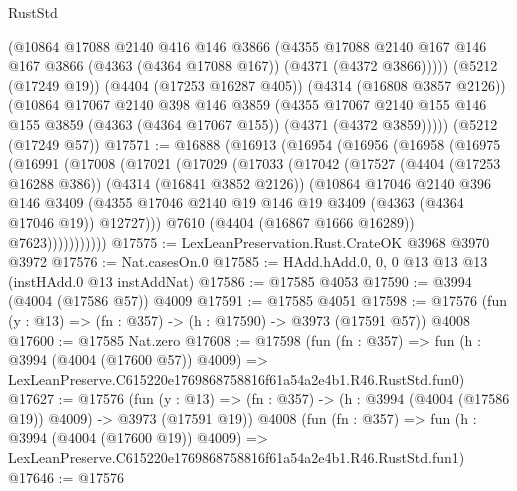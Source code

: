 \begin{lexlean}{RustStd}
\begin{coremodule}
        (@10864
          @17088
          @2140
          @416
          @146
          @3866
          (@4355
            @17088
            @2140
            @167
            @146
            @167
            @3866
            (@4363 (@4364 @17088 @167))
            (@4371 (@4372 @3866)))))
      (@5212 (@17249 @19))
      (@4404 (@17253 @16287 @405))
      (@4314 (@16808 @3857 @2126))
      (@10864
        @17067
        @2140
        @398
        @146
        @3859
        (@4355
          @17067
          @2140
          @155
          @146
          @155
          @3859
          (@4363 (@4364 @17067 @155))
          (@4371 (@4372 @3859)))))
    (@5212 (@17249 @57))
@17571 := @16888
    (@16913
      (@16954
        (@16956
          (@16958
            (@16975
              (@16991
                (@17008
                  (@17021
                    (@17029
                      (@17033
                        (@17042
                          (@17527
                            (@4404 (@17253 @16288 @386))
                            (@4314 (@16841 @3852 @2126))
                            (@10864
                              @17046
                              @2140
                              @396
                              @146
                              @3409
                              (@4355
                                @17046
                                @2140
                                @19
                                @146
                                @19
                                @3409
                                (@4363 (@4364 @17046 @19))
                                @12727)))
                          @7610
                          (@4404 (@16867 @1666 @16289))
                          @7623)))))))))))
@17575 := LexLeanPreservation.Rust.CrateOK @3968 @3970 @3972
@17576 := Nat.casesOn.{0}
@17585 := HAdd.hAdd.{0, 0, 0} @13 @13 @13 (instHAdd.{0} @13 instAddNat)
@17586 := @17585 @4053
@17590 := @3994 (@4004 (@17586 @57)) @4009
@17591 := @17585 @4051
@17598 := @17576 (fun (y : @13) => (fn : @357) -> (h : @17590) -> @3973 (@17591 @57)) @4008
@17600 := @17585 Nat.zero
@17608 := @17598
    (fun (fn : @357) =>
    fun (h : @3994 (@4004 (@17600 @57)) @4009) =>
    LexLeanPreserve.C615220e1769868758816f61a54a2e4b1.R46.RustStd.fun0)
@17627 := @17576
    (fun (y : @13) => (fn : @357) -> (h : @3994 (@4004 (@17586 @19)) @4009) -> @3973 (@17591 @19))
    @4008
    (fun (fn : @357) =>
    fun (h : @3994 (@4004 (@17600 @19)) @4009) =>
    LexLeanPreserve.C615220e1769868758816f61a54a2e4b1.R46.RustStd.fun1)
@17646 := @17576

\end{coremodule}
\end{lexlean}
